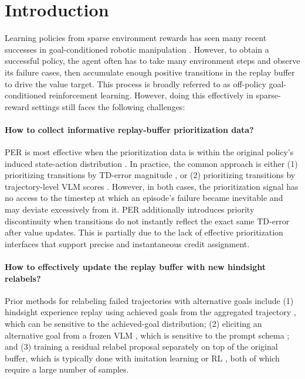 \documentclass{article}
\begin{document}
\section{Introduction}
\label{sec:intro}

Learning policies from sparse environment rewards has seen many
recent successes in goal-conditioned robotic manipulation
\citep{andrychowicz2017her,plappert2018multigoal,haarnoja2018sac}.
However, to obtain a successful policy, the agent often has to take
many environment steps and observe its failure cases, then accumulate
enough positive transitions in the replay buffer to drive the value
target. This process is broadly referred to as off-policy
goal-conditioned reinforcement learning. However, doing this
effectively in sparse-reward settings still faces the following
challenges:

\paragraph{How to collect informative replay-buffer prioritization
data?}
PER is most effective when the prioritization data is within the
original policy's induced state-action distribution
\citep{schaul2016per}. In practice, the common approach is either
(1) prioritizing transitions by TD-error magnitude
\citep{schaul2016per}, or (2) prioritizing transitions by
trajectory-level VLM scores \citep{sharony2026vlmrb}. However, in
both cases, the prioritization signal has no access to the timestep
at which an episode's failure became inevitable and may deviate
excessively from it. PER additionally introduces priority
discontinuity when transitions do not instantly reflect the exact
same TD-error after value updates. This is partially due to the
lack of effective prioritization interfaces that support precise
and instantaneous credit assignment.

\paragraph{How to effectively update the replay buffer with new
hindsight relabels?}
Prior methods for relabeling failed trajectories with alternative
goals include (1) hindsight experience replay using achieved goals
from the aggregated trajectory \citep{andrychowicz2017her}, which
can be sensitive to the achieved-goal distribution; (2) eliciting
an alternative goal from a frozen VLM
\citep{rocamonde2024vlmreward,lee2025kagi}, which is sensitive to
the prompt schema \citep{sharony2026vlmrb}; and (3) training a
residual relabel proposal separately on top of the original buffer,
which is typically done with imitation learning
\citep{urpi2024caiac} or RL \citep{hu2026echo,mesnard2021cca}, both
of which require a large number of samples.
\end{document}
